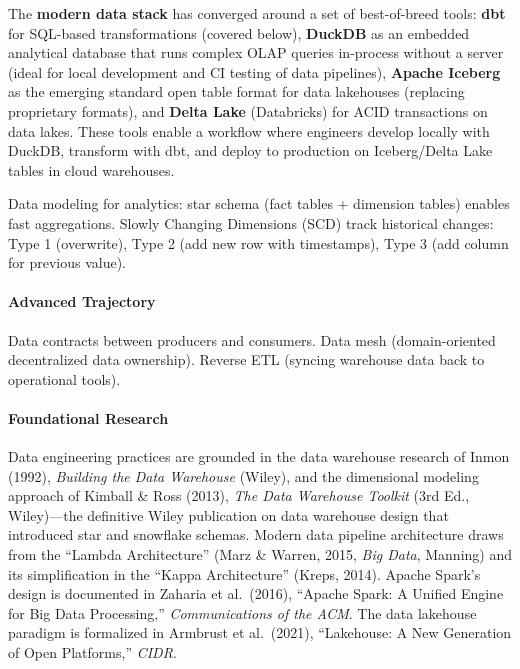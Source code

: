 \documentclass[11pt, a4paper, oneside]{report}
\begin{document}
The \textbf{modern data stack} has converged around a set of best-of-breed tools: \textbf{dbt} for SQL-based transformations (covered below), \textbf{DuckDB} as an embedded analytical database that runs complex OLAP queries in-process without a server (ideal for local development and CI testing of data pipelines), \textbf{Apache Iceberg} as the emerging standard open table format for data lakehouses (replacing proprietary formats), and \textbf{Delta Lake} (Databricks) for ACID transactions on data lakes. These tools enable a workflow where engineers develop locally with DuckDB, transform with dbt, and deploy to production on Iceberg/Delta Lake tables in cloud warehouses.

Data modeling for analytics: star schema (fact tables + dimension tables) enables fast aggregations. Slowly Changing Dimensions (SCD) track historical changes: Type 1 (overwrite), Type 2 (add new row with timestamps), Type 3 (add column for previous value).

\paragraph{Advanced Trajectory} Data contracts between producers and consumers. Data mesh (domain-oriented decentralized data ownership). Reverse ETL (syncing warehouse data back to operational tools).


\paragraph{Foundational Research} Data engineering practices are grounded in the data warehouse research of Inmon (1992), \emph{Building the Data Warehouse} (Wiley), and the dimensional modeling approach of Kimball \& Ross (2013), \emph{The Data Warehouse Toolkit} (3rd Ed., Wiley)---the definitive Wiley publication on data warehouse design that introduced star and snowflake schemas. Modern data pipeline architecture draws from the ``Lambda Architecture'' (Marz \& Warren, 2015, \emph{Big Data}, Manning) and its simplification in the ``Kappa Architecture'' (Kreps, 2014). Apache Spark's design is documented in Zaharia et al.\ (2016), ``Apache Spark: A Unified Engine for Big Data Processing,'' \emph{Communications of the ACM}. The data lakehouse paradigm is formalized in Armbrust et al.\ (2021), ``Lakehouse: A New Generation of Open Platforms,'' \emph{CIDR}.
\end{document}
